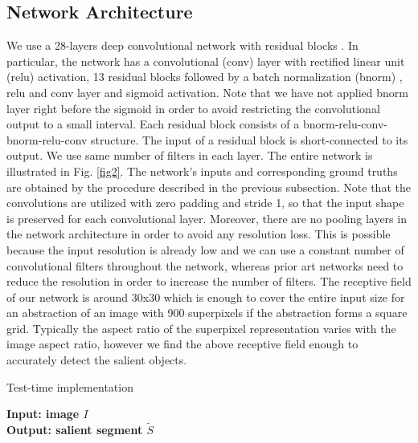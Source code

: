 \documentclass[a4paper,conference]{IEEEtran}
\begin{document}
\subsection{Network Architecture}
We use a 28-layers deep convolutional network with residual blocks \cite{He}.
In particular, the network has a convolutional (conv) layer with rectified linear unit \cite{Nair} (relu) activation, 13 residual blocks followed by a batch normalization \cite{Ioffe} (bnorm) , relu and conv layer and sigmoid activation. 
Note that we have not applied bnorm layer right before the sigmoid in order to avoid restricting the convolutional output to a small interval.
Each residual block consists of a bnorm-relu-conv-bnorm-relu-conv structure.
The input of a residual block is short-connected to its output.
We use same number of filters in each layer.
The entire network is illustrated in Fig. \ref{fig2}.
The network's inputs and corresponding ground truths are obtained by the procedure described in the previous subsection.
Note that the convolutions are utilized with zero padding and stride 1, so that the input shape is preserved for each convolutional layer.
Moreover, there are no pooling layers in the network architecture in order to avoid any resolution loss.
This is possible because the input resolution is already low and we can use a constant number of convolutional filters throughout the network, whereas prior art networks need to reduce the resolution in order to increase the number of filters.
The receptive field of our network is around 30x30 which is enough to cover the entire input size for an abstraction of an image with 900 superpixels if the abstraction forms a square grid.
Typically the aspect ratio of the superpixel representation varies with the image aspect ratio, however we find the above receptive field enough to accurately detect the salient objects.


\begin{algorithm}
\caption{Test-time implementation}\label{testalgorithm}
\hspace*{\algorithmicindent} \textbf{Input: image $ I $} \\
\hspace*{\algorithmicindent} \textbf{Output: salient segment $ \tilde{S} $ } 
\begin{algorithmic}[1] \\
 \\
 \\
 \\
\end{algorithmic}
\end{algorithm}
\end{document}
